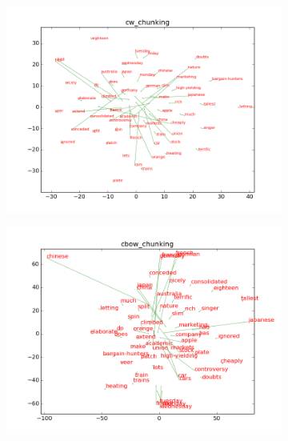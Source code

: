 \begin{figure}[h]
\caption{updated vs. no-updated word representations for chunking}
\centering
\begin{subfigure}{6cm}
	\centering
    \includegraphics[scale=0.3]{plots/vectorField/cw_chunking.png}    	
	\label{fig:bestpos}
	\subcaption{}	
\end{subfigure}
\begin{subfigure}{6cm}
	\centering
    \includegraphics[scale=0.3]{plots/vectorField/cbow_chunking.png}
	\label{fig:bestchunking}
	\subcaption{}	
\end{subfigure}
\begin{subfigure}{6cm}
	\centering

\end{subfigure}
\end{figure}

